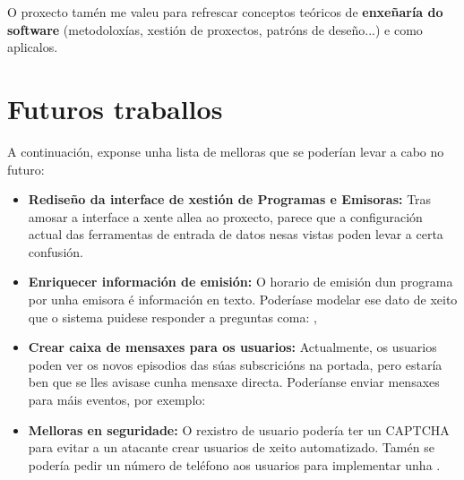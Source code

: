 O proxecto tamén me valeu para refrescar conceptos teóricos de \textbf{enxeñaría do software} (metodoloxías, xestión de proxectos, patróns de deseño...) e como aplicalos.


\section{Futuros traballos}

A continuación, exponse unha lista de melloras que se poderían levar a cabo no futuro:

\begin{itemize}
	
	\item \textbf{Rediseño da interface de xestión de Programas e Emisoras:} Tras amosar a interface a xente allea ao proxecto, parece que a configuración actual das ferramentas de entrada de datos nesas vistas poden levar a certa confusión.
	
	\item \textbf{Enriquecer información de emisión:} O horario de emisión dun programa por unha emisora é información en texto. Poderíase modelar ese dato de xeito que o sistema puidese responder a preguntas coma: , 
	
	\item \textbf{Crear caixa de mensaxes para os usuarios:} Actualmente, os usuarios poden ver os novos episodios das súas subscricións na portada, pero estaría ben que se lles avisase cunha mensaxe directa. Poderíanse enviar mensaxes para máis eventos, por exemplo: 
	
	\item \textbf{Melloras en seguridade:} O rexistro de usuario podería ter un CAPTCHA para evitar a un atacante crear usuarios de xeito automatizado. Tamén se podería pedir un número de teléfono aos usuarios para implementar unha .
\end{itemize}